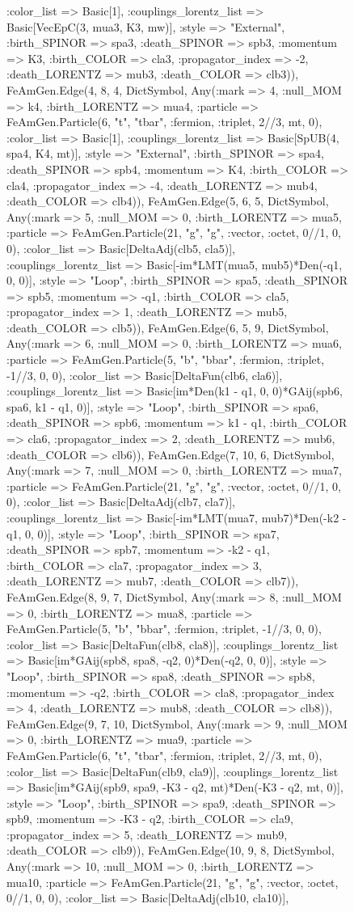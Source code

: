 \documentclass{revtex4}
\begin{document}
\begin{figure}[!htb]
\begin{center}
{:color_list => Basic[1], :couplings_lorentz_list => Basic[VecEpC(3, mua3, K3, mw)], :style => "External", :birth_SPINOR => spa3, :death_SPINOR => spb3, :momentum => K3, :birth_COLOR => cla3, :propagator_index => -2, :death_LORENTZ => mub3, :death_COLOR => clb3)), FeAmGen.Edge(4, 8, 4, Dict{Symbol, Any}(:mark => 4, :null_MOM => k4, :birth_LORENTZ => mua4, :particle => FeAmGen.Particle(6, "t", "tbar", :fermion, :triplet, 2//3, mt, 0), :color_list => Basic[1], :couplings_lorentz_list => Basic[SpUB(4, spa4, K4, mt)], :style => "External", :birth_SPINOR => spa4, :death_SPINOR => spb4, :momentum => K4, :birth_COLOR => cla4, :propagator_index => -4, :death_LORENTZ => mub4, :death_COLOR => clb4)), FeAmGen.Edge(5, 6, 5, Dict{Symbol, Any}(:mark => 5, :null_MOM => 0, :birth_LORENTZ => mua5, :particle => FeAmGen.Particle(21, "g", "g", :vector, :octet, 0//1, 0, 0), :color_list => Basic[DeltaAdj(clb5, cla5)], :couplings_lorentz_list => Basic[-im*LMT(mua5, mub5)*Den(-q1, 0, 0)], :style => "Loop", :birth_SPINOR => spa5, :death_SPINOR => spb5, :momentum => -q1, :birth_COLOR => cla5, :propagator_index => 1, :death_LORENTZ => mub5, :death_COLOR => clb5)), FeAmGen.Edge(6, 5, 9, Dict{Symbol, Any}(:mark => 6, :null_MOM => 0, :birth_LORENTZ => mua6, :particle => FeAmGen.Particle(5, "b", "bbar", :fermion, :triplet, -1//3, 0, 0), :color_list => Basic[DeltaFun(clb6, cla6)], :couplings_lorentz_list => Basic[im*Den(k1 - q1, 0, 0)*GAij(spb6, spa6, k1 - q1, 0)], :style => "Loop", :birth_SPINOR => spa6, :death_SPINOR => spb6, :momentum => k1 - q1, :birth_COLOR => cla6, :propagator_index => 2, :death_LORENTZ => mub6, :death_COLOR => clb6)), FeAmGen.Edge(7, 10, 6, Dict{Symbol, Any}(:mark => 7, :null_MOM => 0, :birth_LORENTZ => mua7, :particle => FeAmGen.Particle(21, "g", "g", :vector, :octet, 0//1, 0, 0), :color_list => Basic[DeltaAdj(clb7, cla7)], :couplings_lorentz_list => Basic[-im*LMT(mua7, mub7)*Den(-k2 - q1, 0, 0)], :style => "Loop", :birth_SPINOR => spa7, :death_SPINOR => spb7, :momentum => -k2 - q1, :birth_COLOR => cla7, :propagator_index => 3, :death_LORENTZ => mub7, :death_COLOR => clb7)), FeAmGen.Edge(8, 9, 7, Dict{Symbol, Any}(:mark => 8, :null_MOM => 0, :birth_LORENTZ => mua8, :particle => FeAmGen.Particle(5, "b", "bbar", :fermion, :triplet, -1//3, 0, 0), :color_list => Basic[DeltaFun(clb8, cla8)], :couplings_lorentz_list => Basic[im*GAij(spb8, spa8, -q2, 0)*Den(-q2, 0, 0)], :style => "Loop", :birth_SPINOR => spa8, :death_SPINOR => spb8, :momentum => -q2, :birth_COLOR => cla8, :propagator_index => 4, :death_LORENTZ => mub8, :death_COLOR => clb8)), FeAmGen.Edge(9, 7, 10, Dict{Symbol, Any}(:mark => 9, :null_MOM => 0, :birth_LORENTZ => mua9, :particle => FeAmGen.Particle(6, "t", "tbar", :fermion, :triplet, 2//3, mt, 0), :color_list => Basic[DeltaFun(clb9, cla9)], :couplings_lorentz_list => Basic[im*GAij(spb9, spa9, -K3 - q2, mt)*Den(-K3 - q2, mt, 0)], :style => "Loop", :birth_SPINOR => spa9, :death_SPINOR => spb9, :momentum => -K3 - q2, :birth_COLOR => cla9, :propagator_index => 5, :death_LORENTZ => mub9, :death_COLOR => clb9)), FeAmGen.Edge(10, 9, 8, Dict{Symbol, Any}(:mark => 10, :null_MOM => 0, :birth_LORENTZ => mua10, :particle => FeAmGen.Particle(21, "g", "g", :vector, :octet, 0//1, 0, 0), :color_list => Basic[DeltaAdj(clb10, cla10)], }
\end{center}
\end{figure}
\end{document}
